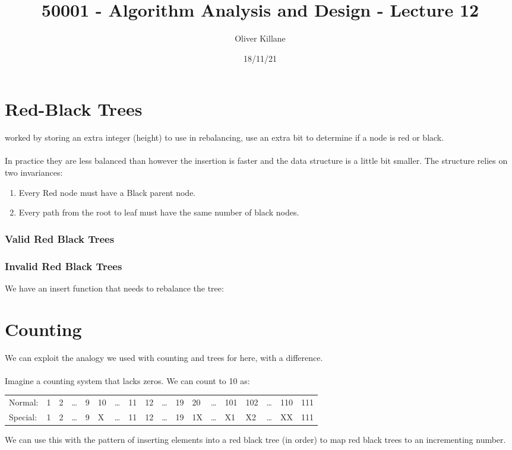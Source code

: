\documentclass{report}
\title{50001 - Algorithm Analysis and Design - Lecture 12}
\author{Oliver Killane}
\date{18/11/21}
\begin{document}
\maketitle
{}

\section*{Red-Black Trees}
 worked by storing an extra integer (height) to use in rebalancing,  use an extra bit to determine if a node is red or black.
\\
\\ In practice they are less balanced than  however the insertion is faster and the data structure is a little bit smaller.
The structure relies on two invariances:
\begin{enumerate}
	\item Every Red node must have a Black parent node.
	\item Every path from the root to leaf must have the same number of black nodes.
\end{enumerate}
\subsubsection*{Valid Red Black Trees}
\subsubsection*{Invalid Red Black Trees}
We have an insert function that needs to rebalance the tree:

\section*{Counting}
We can exploit the analogy we used with counting and trees for  here, with a difference.
\\
\\ Imagine a counting system that lacks zeros. We can count to 10 as:
\begin{center}
	\begin{tabular}{l l l l l l l l l l l l l l l l l l}
		Normal:  & 1 & 2 & \dots & 9 & 10 & \dots & 11 & 12 & \dots & 19 & 20 & \dots & 101 & 102 & \dots & 110 & 111 \\
		Special: & 1 & 2 & \dots & 9 & X  & \dots & 11 & 12 & \dots & 19 & 1X & \dots & X1  & X2  & \dots & XX  & 111 \\
	\end{tabular}
\end{center}
We can use this with the pattern of inserting elements into a red black tree (in order) to map red black trees to an incrementing number.
\end{document}
